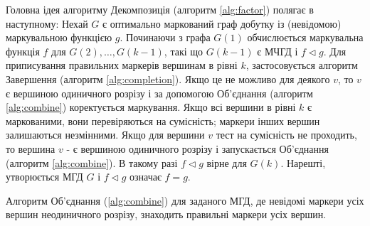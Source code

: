 Головна ідея алгоритму Декомпозиція (алгоритм \ref{alg:factor}) полягає в наступному: Нехай $G$ є оптимально маркований граф добутку із (невідомою) маркувальною функцією $g$.
Починаючи з графа $G(1)$ обчислюється маркувальна функція $f$ для $G(2),\dots,G(k-1)$, такі що $G(k-1)$ є МЧГД і $f \triangleleft g$.
Для приписування правильних маркерів вершинам в рівні $k$, застосовується алгоритм Завершення (алгоритм \ref{alg:completion}).
Якщо це не можливо для деякого $v$, то $v$ є вершиною одиничного розрізу і за допомогою Об'єднання (алгоритм \ref{alg:combine}) коректується маркування.
Якщо всі вершини в рівні $k$ є маркованими, вони перевіряються на сумісність; маркери інших вершин залишаються незмінними.
Якщо для вершини $v$ тест на сумісність не проходить, то вершина $v$ - є вершиною одиничного розрізу і запускається Об'єднання (алгоритм \ref{alg:combine}).
В такому разі $f \triangleleft g$ вірне для $G(k)$.
Нарешті, утворюється МГД $G$ і $f \triangleleft g$ означає $f=g$.



Алгоритм Об'єднання (\ref{alg:combine}) для заданого МГД, де невідомі маркери усіх вершин неодиничного розрізу, знаходить правильні маркери усіх вершин.






